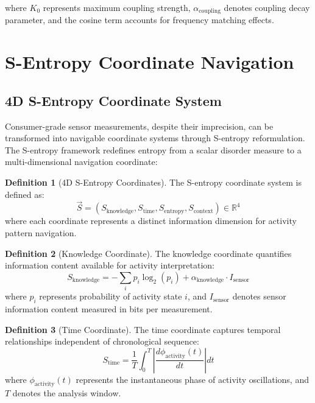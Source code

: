 \documentclass[12pt,a4paper]{article}
\theoremstyle{definition}
\newtheorem{definition}{Definition}[section]
\begin{document}
where $K_0$ represents maximum coupling strength, $\alpha_{\text{coupling}}$ denotes coupling decay parameter, and the cosine term accounts for frequency matching effects.


\section{S-Entropy Coordinate Navigation}

\subsection{4D S-Entropy Coordinate System}

Consumer-grade sensor measurements, despite their imprecision, can be transformed into navigable coordinate systems through S-entropy reformulation. The S-entropy framework redefines entropy from a scalar disorder measure to a multi-dimensional navigation coordinate:

\begin{definition}[4D S-Entropy Coordinates]
The S-entropy coordinate system is defined as:
\begin{equation}
\vec{S} = (S_{\text{knowledge}}, S_{\text{time}}, S_{\text{entropy}}, S_{\text{context}}) \in \mathbb{R}^4
\label{eq:s_entropy_coords}
\end{equation}
where each coordinate represents a distinct information dimension for activity pattern navigation.
\end{definition}

\begin{definition}[Knowledge Coordinate]
The knowledge coordinate quantifies information content available for activity interpretation:
\begin{equation}
S_{\text{knowledge}} = -\sum_{i} p_i \log_2(p_i) + \alpha_{\text{knowledge}} \cdot I_{\text{sensor}}
\end{equation}
where $p_i$ represents probability of activity state $i$, and $I_{\text{sensor}}$ denotes sensor information content measured in bits per measurement.
\end{definition}

\begin{definition}[Time Coordinate]
The time coordinate captures temporal relationships independent of chronological sequence:
\begin{equation}
S_{\text{time}} = \frac{1}{T} \int_0^T \left| \frac{d\phi_{\text{activity}}(t)}{dt} \right| dt
\end{equation}
where $\phi_{\text{activity}}(t)$ represents the instantaneous phase of activity oscillations, and $T$ denotes the analysis window.
\end{definition}
\end{document}
